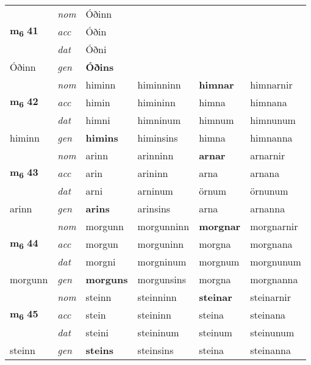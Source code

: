 \begin{longtable}[l]{llllll}
\multirow{3}{*}{{{\textbf{m{\textsubscript{6}}} \Large{\textbf{41}}}}}  & {\footnotesize{{\textit{nom}}}} & Óðinn &     & \textbf{} &   \\*
 &  {\footnotesize{{\textit{acc}}}} & Óðin  &    &   &  \\*
 &  {\footnotesize{{\textit{dat}}}} & Óðni &    &  &  \\*
 {\footnotesize{Óðinn}} &   {\footnotesize{{\textit{gen}}}} & \textbf{Óðins}  &   &  &  \\
\cmidrule{1-6}


\multirow{3}{*}{{{\textbf{m{\textsubscript{6}}} \Large{\textbf{42}}}}}  & {\footnotesize{{\textit{nom}}}} & himinn & himinninn    & \textbf{himnar} & himnarnir  \\*
 &  {\footnotesize{{\textit{acc}}}} & himin  & himininn   & himna  & himnana \\*
 &  {\footnotesize{{\textit{dat}}}} & himni & himninum   & himnum & himnunum \\*
 {\footnotesize{himinn}} &   {\footnotesize{{\textit{gen}}}} & \textbf{himins}  & himinsins  & himna & himnanna \\
\cmidrule{1-6}


\multirow{3}{*}{{{\textbf{m{\textsubscript{6}}} \Large{\textbf{43}}}}}  & {\footnotesize{{\textit{nom}}}} & arinn & arinninn    & \textbf{arnar} & arnarnir  \\*
 &  {\footnotesize{{\textit{acc}}}} & arin  & arininn   & arna  & arnana \\*
 &  {\footnotesize{{\textit{dat}}}} & arni & arninum   & örnum & örnunum \\*
 {\footnotesize{arinn}} &   {\footnotesize{{\textit{gen}}}} & \textbf{arins}  & arinsins  & arna & arnanna \\
\cmidrule{1-6}


\multirow{3}{*}{{{\textbf{m{\textsubscript{6}}} \Large{\textbf{44}}}}}  & {\footnotesize{{\textit{nom}}}} & morgunn & morgunninn    & \textbf{morgnar} & morgnarnir  \\*
 &  {\footnotesize{{\textit{acc}}}} & morgun  & morguninn   & morgna  & morgnana \\*
 &  {\footnotesize{{\textit{dat}}}} & morgni & morgninum   & morgnum & morgnunum \\*
 {\footnotesize{morgunn}} &   {\footnotesize{{\textit{gen}}}} & \textbf{morguns}  & morgunsins  & morgna & morgnanna \\
\cmidrule{1-6}


\multirow{3}{*}{{{\textbf{m{\textsubscript{6}}} \Large{\textbf{45}}}}}  & {\footnotesize{{\textit{nom}}}} & steinn & steinninn    & \textbf{steinar} & steinarnir  \\*
 &  {\footnotesize{{\textit{acc}}}} & stein  & steininn   & steina  & steinana \\*
 &  {\footnotesize{{\textit{dat}}}} & steini & steininum   & steinum & steinunum \\*
 {\footnotesize{steinn}} &   {\footnotesize{{\textit{gen}}}} & \textbf{steins}  & steinsins  & steina & steinanna \\
\cmidrule{1-6}



\end{longtable}
